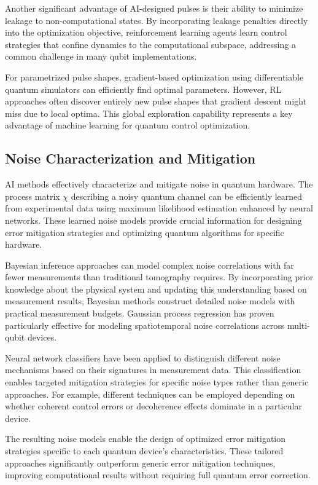 Another significant advantage of AI-designed pulses is their ability to minimize leakage to non-computational states. By incorporating leakage penalties directly into the optimization objective, reinforcement learning agents learn control strategies that confine dynamics to the computational subspace, addressing a common challenge in many qubit implementations.

For parametrized pulse shapes, gradient-based optimization using differentiable quantum simulators can efficiently find optimal parameters. However, RL approaches often discover entirely new pulse shapes that gradient descent might miss due to local optima. This global exploration capability represents a key advantage of machine learning for quantum control optimization.

\subsection{Noise Characterization and Mitigation}

AI methods effectively characterize and mitigate noise in quantum hardware. The process matrix $\chi$ describing a noisy quantum channel can be efficiently learned from experimental data using maximum likelihood estimation enhanced by neural networks. These learned noise models provide crucial information for designing error mitigation strategies and optimizing quantum algorithms for specific hardware.

Bayesian inference approaches can model complex noise correlations with far fewer measurements than traditional tomography requires. By incorporating prior knowledge about the physical system and updating this understanding based on measurement results, Bayesian methods construct detailed noise models with practical measurement budgets. Gaussian process regression has proven particularly effective for modeling spatiotemporal noise correlations across multi-qubit devices.

Neural network classifiers have been applied to distinguish different noise mechanisms based on their signatures in measurement data. This classification enables targeted mitigation strategies for specific noise types rather than generic approaches. For example, different techniques can be employed depending on whether coherent control errors or decoherence effects dominate in a particular device.

The resulting noise models enable the design of optimized error mitigation strategies specific to each quantum device's characteristics. These tailored approaches significantly outperform generic error mitigation techniques, improving computational results without requiring full quantum error correction. 
